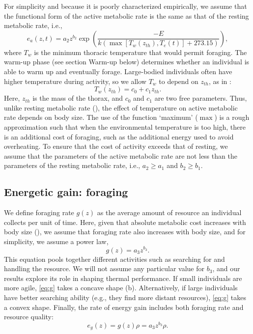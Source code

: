 For simplicity and because it is poorly characterized empirically, we assume that the functional form of the active metabolic rate is the same as that of the resting metabolic rate, i.e.,
\begin{equation} \label{eq:ea}
	e_a(z,t) = a_2 z^{b_2}  \exp \left(\frac{-E}{k (\max[T_w(z_{th}), T_e(t)]+ 273.15)} \right),
\end{equation}
where $T_w$ is the minimum thoracic temperature that would permit foraging.
The warm-up phase (see section Warm-up below) determines whether an individual is able to warm up and eventually forage. %
Large-bodied individuals often have higher temperature during activity, so we allow $T_w$ to depend on $z_{th}$, as in \citet{Bartholomew1977a}:
\begin{equation} \label{eq:Tw}
	T_w(z_{th}) = c_0+ c_1 z_{th}.
\end{equation}
Here, $z_{th}$ is the mass of the thorax, and $c_0$ and $c_1$ are two free parameters.
Thus, unlike resting metabolic rate (), the effect of temperature on active metabolic rate depends on body size.
The use of the function `maximum' ($\max$) is a rough approximation such that when the environmental temperature is too high, there is an additional cost of foraging, such as the additional energy used to avoid overheating.
To ensure that the cost of activity exceeds that of resting, we assume that the parameters of the active metabolic rate are not less than the parameters of the resting metabolic rate, i.e., $a_2 \geq a_1$ and $b_2 \geq b_1$.

\subsection*{Energetic gain: foraging}

We define foraging rate $g(z)$ as the average amount of resource an individual collects per unit of time.
Here, given that absolute metabolic cost increases with body size (), we assume that foraging rate also increases with body size, and for simplicity, we assume a power law,
\begin{equation} \label{eq:g}
	g(z) = a_3 z^{b_3}.
\end{equation}
This equation pools together different activities such as searching for and handling the resource.
We will not assume any particular value for $b_3$, and our results explore its role in shaping thermal performance.
If small individuals are more agile, \cref{eq:g} takes a concave shape (b).
Alternatively, if large individuals have better searching ability (e.g., they find more distant resources), \cref{eq:g} takes a convex shape.
Finally, the rate of energy gain includes both foraging rate and resource quality:
\begin{equation} \label{eq:eg}
	e_g(z) = g(z) \rho = a_3 z^{b_3} \rho.
\end{equation}

